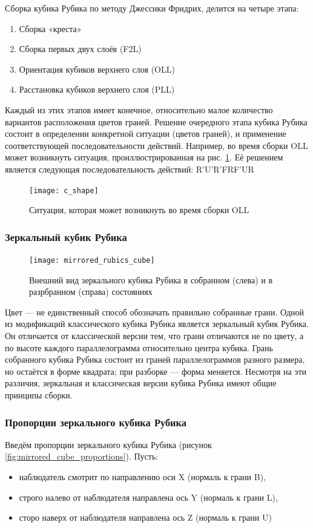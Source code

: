 Сборка кубика Рубика по методу Джессики Фридрих, делится на четыре этапа:
\begin{enumerate}
	\item Сборка «креста»
	\item Сборка первых двух слоёв (F2L)
	\item Ориентация кубиков верхнего слоя (OLL)
	\item Расстановка кубиков верхнего слоя (PLL)
\end{enumerate}

Каждый из этих этапов имеет конечное, относительно малое количество вариантов расположения цветов граней. Решение очередного этапа кубика Рубика состоит в определении конкретной ситуации (цветов граней), и применение соответствующей последовательности действий. Например, во время сборки OLL может возникнуть ситуация, проиллюстрированная на рис. \ref{fig:c_shape}. Её решением является следующая последовательность действий: R'U'R'FRF'UR

\begin{figure}[ht]
	\centering
	\texttt{[image: c\_shape]}
	\caption{Ситуация, которая может возникнуть во время сборки OLL}
	\label{fig:c_shape}
\end{figure}
	
\subsubsection{Зеркальный кубик Рубика}
\begin{figure}[ht]
	\centering
	\texttt{[image: mirrored\_rubics\_cube]}
	\caption{Внешний вид зеркального кубика Рубика в собранном (слева) и в разрбранном (справа) состояниях}
	\label{fig:mirrored_cube}
\end{figure}

Цвет --- не единственный способ обозначать правильно собранные грани. Одной из модификаций классического кубика Рубика является зеркальный кубик Рубика. Он отличается от классической версии тем, что грани отличаются не по цвету, а по высоте каждого параллелограмма относительно центра кубика. Грань собранного кубика Рубика состоит из граней параллелограммов разного размера, но остаётся в форме квадрата; при разборке --- форма меняется. Несмотря на эти различия, зеркальная и классическая версии кубика Рубика имеют общие принципы сборки.

\subsubsection{Пропорции зеркального кубика Рубика}
Введём пропорции зеркального кубика Рубика (рисунок \ref{fig:mirrored_cube_proportions}). Пусть:
\begin{itemize}
	\item наблюдатель смотрит по направлению оси X (нормаль к грани B),
	\item строго налево от наблюдателя направлена ось Y (нормаль к грани L),
	\item сторо наверх от наблюдателя направлена ось Z (нормаль к грани U)
\end{itemize}

